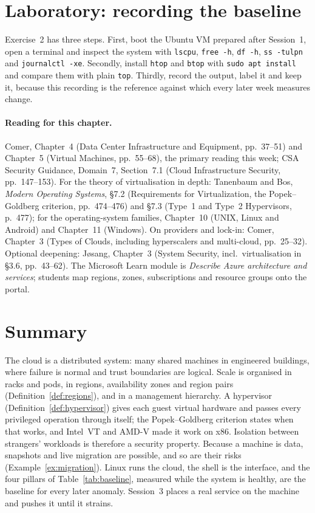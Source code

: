 \section{Laboratory: recording the baseline}

Exercise~2 has three steps. First, boot the Ubuntu VM prepared after
Session~1, open a terminal and inspect the system with \texttt{lscpu},
\texttt{free -h}, \texttt{df -h}, \texttt{ss -tulpn} and
\texttt{journalctl -xe}. Secondly, install \texttt{htop} and \texttt{btop}
with \texttt{sudo apt install} and compare them with plain \texttt{top}.
Thirdly, record the output, label it and keep it, because this recording is
the reference against which every later week measures change.

\paragraph{Reading for this chapter.} Comer, Chapter~4 (Data Center
Infrastructure and Equipment, pp.~37--51) and Chapter~5 (Virtual Machines,
pp.~55--68), the primary reading this week; CSA Security Guidance, Domain~7,
Section~7.1 (Cloud Infrastructure Security, pp.~147--153). For the theory of
virtualisation in depth: Tanenbaum and Bos, \emph{Modern Operating Systems},
\S7.2 (Requirements for Virtualization, the Popek--Goldberg criterion,
pp.~474--476) and \S7.3 (Type~1 and Type~2 Hypervisors, p.~477); for the
operating-system families, Chapter~10 (UNIX, Linux and Android) and
Chapter~11 (Windows). On providers and lock-in: Comer, Chapter~3 (Types of
Clouds, including hyperscalers and multi-cloud, pp.~25--32). Optional
deepening: J\o sang, Chapter~3 (System Security, incl.\ virtualisation in \S3.6, pp.~43--62). The Microsoft Learn module
is \emph{Describe Azure architecture and services}; students map regions,
zones, subscriptions and resource groups onto the portal.

\section{Summary}

The cloud is a distributed system: many shared machines in engineered
buildings, where failure is normal and trust boundaries are logical. Scale is
organised in racks and pods, in regions, availability zones and region pairs
(Definition~\ref{def:regions}), and in a management hierarchy. A hypervisor
(Definition~\ref{def:hypervisor}) gives each guest virtual hardware and
passes every privileged operation through itself; the Popek--Goldberg
criterion states when that works, and Intel~VT and AMD-V made it work on
x86. Isolation between strangers' workloads is therefore a security
property. Because a machine is data, snapshots and live migration are
possible, and so are their risks (Example~\ref{ex:migration}). Linux runs the
cloud, the shell is the interface, and the four pillars of
Table~\ref{tab:baseline}, measured while the system is healthy, are the
baseline for every later anomaly. Session~3 places a real service on the
machine and pushes it until it strains.

